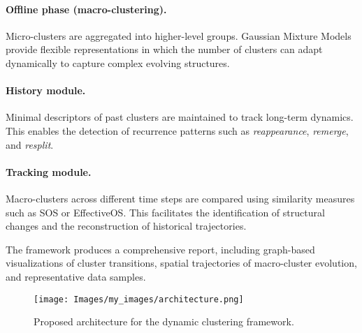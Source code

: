 \paragraph{Offline phase (macro-clustering).}
Micro-clusters are aggregated into higher-level groups. Gaussian Mixture Models
provide flexible representations in which the number of clusters can adapt
dynamically to capture complex evolving structures.

\paragraph{History module.}
Minimal descriptors of past clusters are maintained to track long-term
dynamics. This enables the detection of recurrence patterns such as
\emph{reappearance}, \emph{remerge}, and \emph{resplit}.

\paragraph{Tracking module.}
Macro-clusters across different time steps are compared using similarity
measures such as SOS or EffectiveOS. This facilitates the identification of
structural changes and the reconstruction of historical trajectories.

The framework produces a comprehensive report, including graph-based
visualizations of cluster transitions, spatial trajectories of macro-cluster
evolution, and representative data samples.

\begin{figure}[H]
    \centering
    \texttt{[image: Images/my\_images/architecture.png]}
    \caption{Proposed architecture for the dynamic clustering framework.}
\end{figure}
